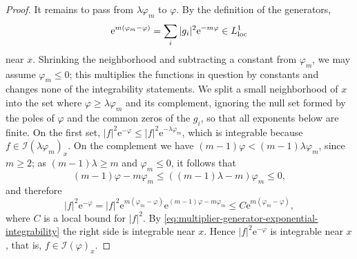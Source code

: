\begin{proof}
It remains to pass from $\lambda\varphi_m$ to $\varphi$. By the definition of the generators,
\begin{equation}\label{eq:multiplier-generator-exponential-integrability}
 \mathrm e^{m(\varphi_m-\varphi)}
                =\sum_i|g_i|^2\mathrm e^{-m\varphi}\in L^1_{\mathrm{loc}}
\end{equation}
near $x$. Shrinking the neighborhood and subtracting a constant from $\varphi_m$, we may assume $\varphi_m\leq0$; this multiplies the functions in question by constants and changes none of the integrability statements. We split a small neighborhood of $x$ into the set where $\varphi\geq\lambda\varphi_m$ and its complement, ignoring the null set formed by the poles of $\varphi$ and the common zeros of the $g_i$, so that all exponents below are finite. On the first set, $|f|^2\mathrm e^{-\varphi}\leq|f|^2\mathrm e^{-\lambda\varphi_m}$, which is integrable because $f\in\mathcal I(\lambda\varphi_m)_x$. On the complement we have $(m-1)\varphi<(m-1)\lambda\varphi_m$, since $m\geq2$; as $(m-1)\lambda\geq m$ and $\varphi_m\leq0$, it follows that
\[
 (m-1)\varphi-m\varphi_m
       \leq((m-1)\lambda-m)\varphi_m\leq0,
\]
and therefore
\[
 |f|^2\mathrm e^{-\varphi}
 =|f|^2\mathrm e^{m(\varphi_m-\varphi)}
                 \mathrm e^{(m-1)\varphi-m\varphi_m}
 \leq C\mathrm e^{m(\varphi_m-\varphi)},
\]
where $C$ is a local bound for $|f|^2$. By \eqref{eq:multiplier-generator-exponential-integrability} the right side is integrable near $x$. Hence $|f|^2\mathrm e^{-\varphi}$ is integrable near $x$, that is, $f\in\mathcal I(\varphi)_x$.
\end{proof}

